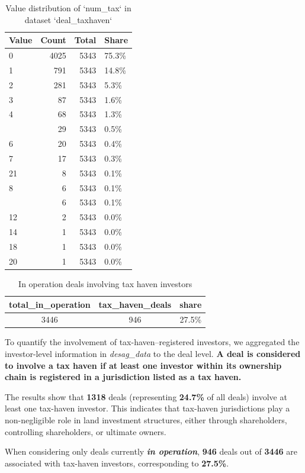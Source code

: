 \documentclass[
  letterpaper,
  DIV=11,
  numbers=noendperiod]{scrreprt}
\begin{document}
\begin{longtable}[t]{lrrl}
\caption{\label{tab:deals-involve-TaxHaven}Value distribution of `num_tax` in dataset `deal_taxhaven`}\\
\toprule
Value & Count & Total & Share\\
\midrule
0 & 4025 & 5343 & 75.3\%\\
1 & 791 & 5343 & 14.8\%\\
2 & 281 & 5343 & 5.3\%\\
3 & 87 & 5343 & 1.6\%\\
4 & 68 & 5343 & 1.3\%\\
\addlinespace
5 & 29 & 5343 & 0.5\%\\
6 & 20 & 5343 & 0.4\%\\
7 & 17 & 5343 & 0.3\%\\
21 & 8 & 5343 & 0.1\%\\
8 & 6 & 5343 & 0.1\%\\
\addlinespace
13 & 6 & 5343 & 0.1\%\\
12 & 2 & 5343 & 0.0\%\\
14 & 1 & 5343 & 0.0\%\\
18 & 1 & 5343 & 0.0\%\\
20 & 1 & 5343 & 0.0\%\\
\bottomrule
\end{longtable}

\begin{longtable}[t]{ccc}
\caption{\label{tab:deals-involve-TaxHaven}In operation deals involving tax haven investors}\\
\toprule
total\_in\_operation & tax\_haven\_deals & share\\
\midrule
3446 & 946 & 27.5\%\\
\bottomrule
\end{longtable}

To quantify the involvement of tax-haven--registered investors, we
aggregated the investor-level information in \emph{desag\_data} to the
deal level. \textbf{A deal is considered to involve a tax haven if at
least one investor within its ownership chain is registered in a
jurisdiction listed as a tax haven.}

The results show that \textbf{1318} deals (representing \textbf{24.7\%}
of all deals) involve at least one tax-haven investor. This indicates
that tax-haven jurisdictions play a non-negligible role in land
investment structures, either through shareholders, controlling
shareholders, or ultimate owners.

When considering only deals currently \textbf{\emph{in operation}},
\textbf{946} deals out of \textbf{3446} are associated with tax-haven
investors, corresponding to \textbf{27.5\%}.
\end{document}
